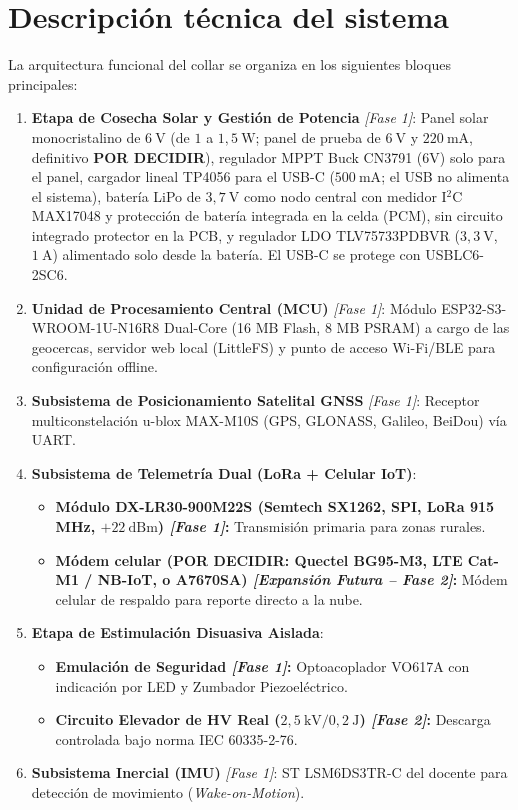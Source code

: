 \section*{Descripción técnica del sistema}
La arquitectura funcional del collar se organiza en los siguientes bloques principales:
\begin{enumerate}[leftmargin=*]
    \item \textbf{Etapa de Cosecha Solar y Gestión de Potencia} \emph{[Fase 1]}: Panel solar monocristalino de $6~\text{V}$ (de $1$ a $1,5~\text{W}$; panel de prueba de $6~\text{V}$ y $220~\text{mA}$, definitivo \textbf{POR DECIDIR}), regulador MPPT Buck CN3791 (6V) solo para el panel, cargador lineal TP4056 para el USB-C ($500~\text{mA}$; el USB no alimenta el sistema), batería LiPo de $3,7~\text{V}$ como nodo central con medidor I$^2$C MAX17048 y protección de batería integrada en la celda (PCM), sin circuito integrado protector en la PCB, y regulador LDO TLV75733PDBVR ($3,3~\text{V}$, $1~\text{A}$) alimentado solo desde la batería. El USB-C se protege con USBLC6-2SC6.
    \item \textbf{Unidad de Procesamiento Central (MCU)} \emph{[Fase 1]}: Módulo ESP32-S3-WROOM-1U-N16R8 Dual-Core (16 MB Flash, 8 MB PSRAM) a cargo de las geocercas, servidor web local (LittleFS) y punto de acceso Wi-Fi/BLE para configuración offline.
    \item \textbf{Subsistema de Posicionamiento Satelital GNSS} \emph{[Fase 1]}: Receptor multiconstelación u-blox MAX-M10S (GPS, GLONASS, Galileo, BeiDou) vía UART.
    \item \textbf{Subsistema de Telemetría Dual (LoRa + Celular IoT)}:
    \begin{itemize}
        \item \textbf{Módulo DX-LR30-900M22S (Semtech SX1262, SPI, LoRa 915 MHz, $+22~\text{dBm}$) \emph{[Fase 1]}:} Transmisión primaria para zonas rurales.
        \item \textbf{Módem celular (\textbf{POR DECIDIR}: Quectel BG95-M3, LTE Cat-M1 / NB-IoT, o A7670SA) \emph{[Expansión Futura -- Fase 2]}:} Módem celular de respaldo para reporte directo a la nube.
    \end{itemize}
    \item \textbf{Etapa de Estimulación Disuasiva Aislada}:
    \begin{itemize}
        \item \textbf{Emulación de Seguridad \emph{[Fase 1]}:} Optoacoplador VO617A con indicación por LED y Zumbador Piezoeléctrico.
        \item \textbf{Circuito Elevador de HV Real ($2,5~\text{kV} / 0,2~\text{J}$) \emph{[Fase 2]}:} Descarga controlada bajo norma IEC 60335-2-76.
    \end{itemize}
    \item \textbf{Subsistema Inercial (IMU)} \emph{[Fase 1]}: ST LSM6DS3TR-C del docente para detección de movimiento (\emph{Wake-on-Motion}).
\end{enumerate}